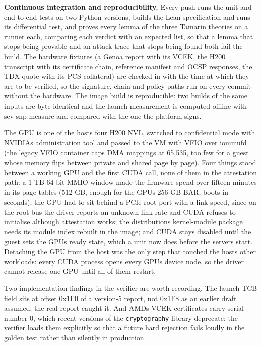 \documentclass[letterpaper,twocolumn,10pt]{article}
\begin{document}
\textbf{Continuous integration and reproducibility.} Every push runs the unit and end-to-end tests on two Python versions, builds the Lean specification and runs its differential test, and proves every lemma of the three Tamarin theories on a runner each, comparing each verdict with an expected list, so that a lemma that stops being provable and an attack trace that stops being found both fail the build. The hardware fixtures (a Genoa report with its VCEK, the H200 transcript with its certificate chain, reference manifest and OCSP responses, the TDX quote with its PCS collateral) are checked in with the time at which they are to be verified, so the signature, chain and policy paths run on every commit without the hardware. The image build is reproducible: two builds of the same inputs are byte-identical and the launch measurement is computed offline with sev-snp-measure \cite{sevsnpmeasure} and compared with the one the platform signs.

The GPU is one of the host\textquotesingle s four H200 NVL, switched to confidential mode with NVIDIA\textquotesingle s administration tool and passed to the VM with VFIO over iommufd (the legacy VFIO container caps DMA mappings at 65,535, too few for a guest whose memory flips between private and shared page by page). Four things stood between a working GPU and the first CUDA call, none of them in the attestation path: a 1 TB 64-bit MMIO window made the firmware spend over fifteen minutes in its page tables (512 GB, enough for the GPU\textquotesingle s 256 GB BAR, boots in seconds); the GPU had to sit behind a PCIe root port with a link speed, since on the root bus the driver reports an unknown link rate and CUDA refuses to initialise although attestation works; the distribution\textquotesingle s kernel-module package needs its module index rebuilt in the image; and CUDA stays disabled until the guest sets the GPU\textquotesingle s ready state, which a unit now does before the servers start. Detaching the GPU from the host was the only step that touched the host\textquotesingle s other workloads: every CUDA process opens every GPU\textquotesingle s device node, so the driver cannot release one GPU until all of them restart.

Two implementation findings in the verifier are worth recording. The launch-TCB field sits at offset 0x1F0 of a version-5 report, not 0x1F8 as an earlier draft assumed; the real report caught it. And AMD\textquotesingle s VCEK certificates carry serial number 0, which recent versions of the \texttt{cryptography} library deprecate; the verifier loads them explicitly so that a future hard rejection fails loudly in the golden test rather than silently in production.
\end{document}
